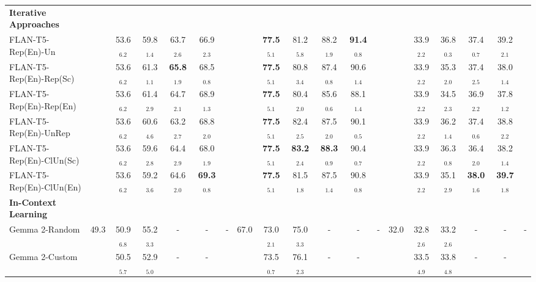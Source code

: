 \documentclass[11pt]{article}
\theoremstyle{definition}
\begin{document}
\begin{table*}[hbt]
{\begin{tabular}{l|cccccc|cccccc|cccccc}
\hdashline

\textbf{Iterative Approaches} &
& & & & & &
& & & & & &
& & & & & \\

FLAN-T5-Rep(En)-Un &
& 53.6$_{6.2}$ & 59.8$_{1.4}$ & 63.7$_{2.6}$ & 66.9$_{2.3}$ & &
& \textbf{77.5}$_{5.1}$ & 81.2$_{5.8}$ & 88.2$_{1.9}$ & \textbf{91.4}$_{0.8}$ & &
& 33.9$_{2.2}$ & 36.8$_{0.3}$ & 37.4$_{0.7}$ & 39.2$_{2.1}$ & \\

FLAN-T5-Rep(En)-Rep(Sc) &
& 53.6$_{6.2}$ & 61.3$_{1.1}$ & \textbf{65.8}$_{1.9}$ & 68.5$_{0.8}$ & &
& \textbf{77.5}$_{5.1}$ & 80.8$_{3.4}$ & 87.4$_{0.8}$ & 90.6$_{1.4}$ & &
& 33.9$_{2.2}$ & 35.3$_{2.0}$ & 37.4$_{2.5}$ & 38.0$_{1.4}$ & \\

FLAN-T5-Rep(En)-Rep(En) &
& 53.6$_{6.2}$ & 61.4$_{2.9}$ & 64.7$_{2.1}$ & 68.9$_{1.3}$ & &
& \textbf{77.5}$_{5.1}$ & 80.4$_{2.0}$ & 85.6$_{0.6}$ & 88.1$_{1.4}$ & &
& 33.9$_{2.2}$ & 34.5$_{2.3}$ & 36.9$_{2.2}$ & 37.8$_{1.2}$ & \\

FLAN-T5-Rep(En)-UnRep &
& 53.6$_{6.2}$ & 60.6$_{4.6}$ & 63.2$_{2.7}$ & 68.8$_{2.0}$ & &
& \textbf{77.5}$_{5.1}$ & 82.4$_{2.5}$ & 87.5$_{2.0}$ & 90.1$_{0.5}$ & &
& 33.9$_{2.2}$ & 36.2$_{1.4}$ & 37.4$_{0.6}$ & 38.8$_{2.2}$ & \\

FLAN-T5-Rep(En)-ClUn(Sc) &
& 53.6$_{6.2}$ & 59.6$_{2.8}$ & 64.4$_{2.9}$ & 68.0$_{1.9}$ & &
& \textbf{77.5}$_{5.1}$ & \textbf{83.2}$_{2.4}$ & \textbf{88.3}$_{0.9}$ & 90.4$_{0.7}$ & &
& 33.9$_{2.2}$ & 36.3$_{0.8}$ & 36.4$_{2.0}$ & 38.2$_{1.4}$ & \\

FLAN-T5-Rep(En)-ClUn(En) &
& 53.6$_{6.2}$ & 59.2$_{3.6}$ & 64.6$_{2.0}$ & \textbf{69.3}$_{0.8}$ & &
& \textbf{77.5}$_{5.1}$ & 81.5$_{1.8}$ & 87.5$_{1.4}$ & 90.8$_{0.8}$ & &
& 33.9$_{2.2}$ & 35.1$_{2.9}$ & \textbf{38.0}$_{1.6}$ & \textbf{39.7}$_{1.8}$ & \\

\hdashline

\textbf{In-Context Learning} &
& & & & & &
& & & & & &
& & & & & \\

Gemma 2-Random &
49.3 & 50.9$_{6.8}$ & 55.2$_{3.3}$ & - & - & - &
67.0 & 73.0$_{2.1}$ & 75.0$_{3.3}$ & - & - & - &
32.0 & 32.8$_{2.6}$ & 33.2$_{2.6}$ & - & - & - \\

Gemma 2-Custom &
& 50.5$_{5.7}$ & 52.9$_{5.0}$ & - & - & &
& 73.5$_{0.7}$ & 76.1$_{2.3}$ & - & - & &
& 33.5$_{4.9}$ & 33.8$_{4.8}$ & - & - & \\


\end{tabular}}
\end{table*}
\end{document}
